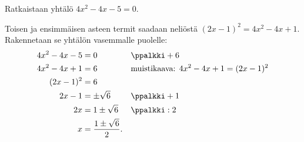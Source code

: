 \begin{esimerkki}
Ratkaistaan yhtälö $4x^2-4x-5=0$.

Toisen ja ensimmäisen asteen termit saadaan neliöstä $(2x-1)^2=4x^2-4x+1$. Rakennetaan se yhtälön vasemmalle puolelle:
\begin{align*}
4x^2-4x-5 &= 0 && \ppalkki +6 \\
4x^2-4x+1 &= 6 &&\text{muistikaava: $  4x^2-4x+1 = (2x-1)^2$} \\
(2x-1)^2 &= 6 \\
2x-1 &= \pm \sqrt{6} && \ppalkki +1\\
2x &= 1 \pm \sqrt{6} && \ppalkki : 2\\
x &= \frac{1 \pm \sqrt{6}}{2}.
\end{align*}
\end{esimerkki}

%
%
%


